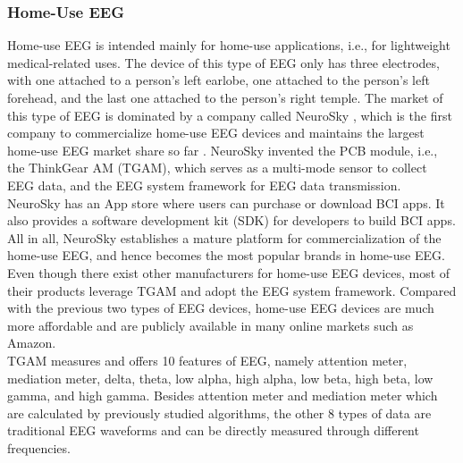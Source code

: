 \subsubsection{Home-Use EEG}
Home-use EEG is intended mainly for home-use applications, i.e., for lightweight medical-related uses. The device of this type of EEG only has three electrodes, with one attached to a person's left earlobe, one attached to the person's left forehead, and the last one attached to the person's right temple. %
The market of this type of EEG is dominated by a company called NeuroSky \cite{NeuroSky}, which is the first company to commercialize home-use EEG devices and maintains the largest home-use EEG market share so far \cite{firsthomeeeg,neuroskymarket}. NeuroSky invented the PCB module, i.e., the ThinkGear AM (TGAM), which serves as a multi-mode sensor to collect EEG data, and the  EEG system framework for EEG data transmission. NeuroSky has an App store where users can purchase or download BCI apps. It also provides a software development kit (SDK) for developers to build BCI apps. All in all, NeuroSky establishes a mature platform for commercialization of the home-use EEG, and hence becomes the most popular brands in home-use EEG. Even though there exist other manufacturers for home-use EEG devices, most of their products leverage TGAM and adopt the EEG system framework. Compared with the previous two types of EEG devices, home-use EEG devices are much more affordable and are publicly available in many online markets such as Amazon. \\
\indent TGAM measures and offers 10 features of EEG, namely attention meter, mediation meter, delta, theta, low alpha, high alpha, low beta, high beta, low gamma, and high gamma. Besides attention meter and mediation meter which are calculated by previously studied algorithms, the other 8 types of data are traditional EEG waveforms and can be directly measured through different frequencies.
%
